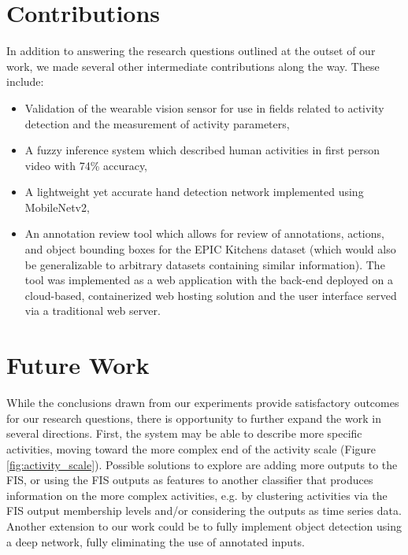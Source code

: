 \documentclass[12pt]{report}
\begin{document}
\section{Contributions}
In addition to answering the research questions outlined at the outset of our work, we made several other intermediate contributions along the way. These include:
\begin{itemize}
\item Validation of the wearable vision sensor for use in fields related to activity detection and the measurement of activity parameters,
\item A fuzzy inference system which described human activities in first person video with 74\% accuracy,
\item A lightweight yet accurate hand detection network implemented using MobileNetv2,
\item An annotation review tool which allows for review of annotations, actions, and object bounding boxes for the EPIC Kitchens dataset (which would also be generalizable to arbitrary datasets containing similar information). The tool was implemented as a web application with the back-end deployed on a cloud-based, containerized web hosting solution and the user interface served via a traditional web server.
\end{itemize}

\section{Future Work}
While the conclusions drawn from our experiments provide satisfactory outcomes for our research questions, there is opportunity to further expand the work in several directions. First, the system may be able to describe more specific activities, moving toward the more complex end of the activity scale (Figure \ref{fig:activity_scale}). Possible solutions to explore are adding more outputs to the FIS, or using the FIS outputs as features to another classifier that produces information on the more complex activities, e.g. by clustering activities via the FIS output membership levels and/or considering the outputs as time series data. Another extension to our work could be to fully implement object detection using a deep network, fully eliminating the use of annotated inputs.
\end{document}
